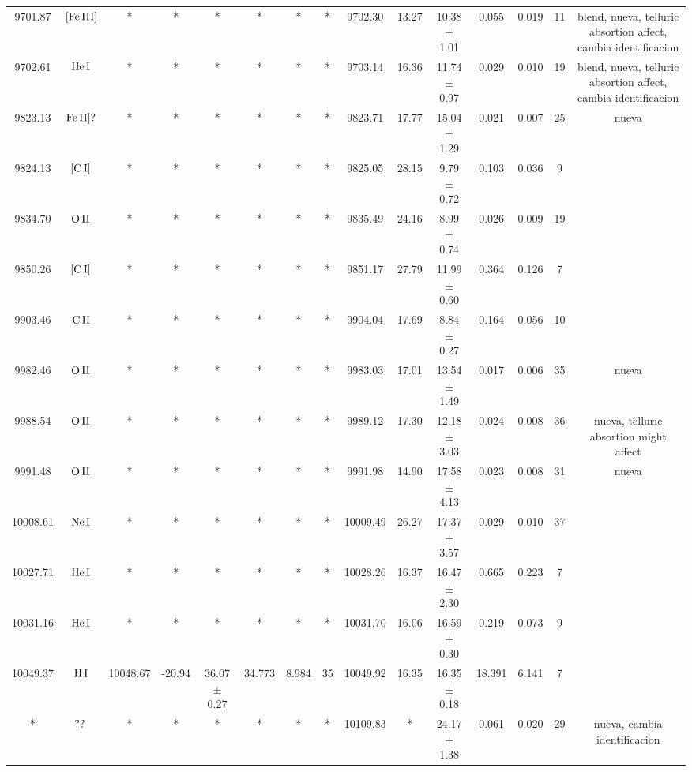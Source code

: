 \documentclass{article}
\begin{document}
\begin{table*}
\begin{adjustbox}{width=\textwidth}
\begin{tabular}{ccccccccccccccc}
9701.87 & $\mbox{[Fe}\thinspace \mbox{III]}$ & * & * & * & * & * & * & 9702.30 & 13.27 & 10.38 $\pm$ 1.01 & 0.055 & 0.019 & 11 &  blend, nueva, telluric absortion affect, cambia identificacion \\
9702.61 & $\mbox{He}\thinspace \mbox{I}$ & * & * & * & * & * & * & 9703.14 & 16.36 & 11.74 $\pm$ 0.97 & 0.029 & 0.010 & 19 &  blend, nueva, telluric absortion affect, cambia identificacion \\
9823.13 & $\mbox{Fe}\thinspace \mbox{II]?}$ & * & * & * & * & * & * & 9823.71 & 17.77 & 15.04 $\pm$ 1.29 & 0.021 & 0.007 & 25 &  nueva \\
9824.13 & $\mbox{[C}\thinspace \mbox{I]}$ & * & * & * & * & * & * & 9825.05 & 28.15 & 9.79 $\pm$ 0.72 & 0.103 & 0.036 & 9 &  \\
9834.70 & $\mbox{O}\thinspace \mbox{II}$ & * & * & * & * & * & * & 9835.49 & 24.16 & 8.99 $\pm$ 0.74 & 0.026 & 0.009 & 19 &  \\
9850.26 & $\mbox{[C}\thinspace \mbox{I]}$ & * & * & * & * & * & * & 9851.17 & 27.79 & 11.99 $\pm$ 0.60 & 0.364 & 0.126 & 7 &  \\
9903.46 & $\mbox{C}\thinspace \mbox{II}$ & * & * & * & * & * & * & 9904.04 & 17.69 & 8.84 $\pm$ 0.27 & 0.164 & 0.056 & 10 &  \\
9982.46 & $\mbox{O}\thinspace \mbox{II}$ & * & * & * & * & * & * & 9983.03 & 17.01 & 13.54 $\pm$ 1.49 & 0.017 & 0.006 & 35 &  nueva \\
9988.54 & $\mbox{O}\thinspace \mbox{II}$ & * & * & * & * & * & * & 9989.12 & 17.30 & 12.18 $\pm$ 3.03 & 0.024 & 0.008 & 36 &  nueva, telluric absortion might affect \\
9991.48 & $\mbox{O}\thinspace \mbox{II}$ & * & * & * & * & * & * & 9991.98 & 14.90 & 17.58 $\pm$ 4.13 & 0.023 & 0.008 & 31 &  nueva \\
10008.61 & $\mbox{Ne}\thinspace \mbox{I}$ & * & * & * & * & * & * & 10009.49 & 26.27 & 17.37 $\pm$ 3.57 & 0.029 & 0.010 & 37 &  \\
10027.71 & $\mbox{He}\thinspace \mbox{I}$ & * & * & * & * & * & * & 10028.26 & 16.37 & 16.47 $\pm$ 2.30 & 0.665 & 0.223 & 7 &  \\
10031.16 & $\mbox{He}\thinspace \mbox{I}$ & * & * & * & * & * & * & 10031.70 & 16.06 & 16.59 $\pm$ 0.30 & 0.219 & 0.073 & 9 &  \\
10049.37 & $\mbox{H}\thinspace \mbox{I}$ & 10048.67 & -20.94 & 36.07 $\pm$ 0.27 & 34.773 & 8.984 & 35 & 10049.92 & 16.35 & 16.35 $\pm$ 0.18 & 18.391 & 6.141 & 7 &  \\
* & $\mbox{??}\thinspace \mbox{}$ & * & * & * & * & * & * & 10109.83 & * & 24.17 $\pm$ 1.38 & 0.061 & 0.020 & 29 &  nueva, cambia identificacion \\

\end{tabular}
\end{adjustbox}
\end{table*}
\end{document}
